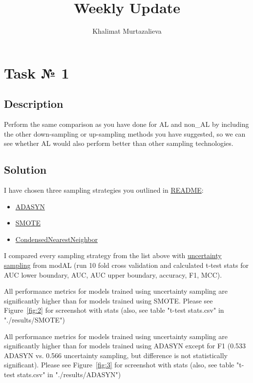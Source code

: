 \documentclass[a4paper,10pt]{article}
\title{Weekly Update}
\author{Khalimat Murtazalieva}
\begin{document}
\maketitle

\tableofcontents

\medskip


\section{Task № 1}
\subsection{Description}
Perform the same comparison as you have done for AL and non\_AL by including the other down-sampling or up-sampling methods you have suggested, so we can see whether AL would also perform better than other sampling technologies.

\subsection{Solution}
I have chosen three sampling strategies you outlined in \href{https://github.com/Khalimat/SCAMmer}{README}:
\begin{itemize}
    \item \href{https://imbalanced-learn.readthedocs.io/en/stable/generated/imblearn.over_sampling.ADASYN.html}{ADASYN}
    \item \href{https://imbalanced-learn.readthedocs.io/en/stable/generated/imblearn.over_sampling.SMOTE.html}{SMOTE}
    \item \href{https://imbalanced-learn.readthedocs.io/en/stable/generated/imblearn.under_sampling.CondensedNearestNeighbour.html}{CondensedNearestNeighbor}
\end{itemize}

I compared every sampling strategy from the list above with \href{https://modal-python.readthedocs.io/en/latest/content/apireference/uncertainty.html}{uncertainty sampling} from modAL (run 10 fold cross validation and calculated t-test stats for AUC lower boundary, AUC, AUC upper boundary, accuracy, F1, MCC). 

All performance metrics for models trained using uncertainty sampling are significantly higher than for models trained using SMOTE. Please see Figure~\ref{fig:2} for screenshot with stats (also, see table "t-test stats.csv" in "./results/SMOTE")

All performance metrics for models trained using uncertainty sampling are significantly higher than for models trained using ADASYN except for F1 (0.533 ADASYN vs. 0.566 uncertainty sampling, but difference is not statistically significant). Please see Figure~\ref{fig:3} for screenshot with stats (also, see table "t-test stats.csv" in "./results/ADASYN")
\end{document}
